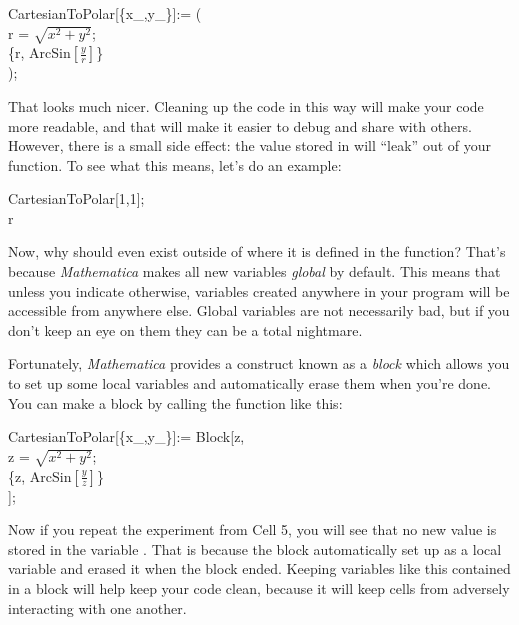 \begin{code}
	   CartesianToPolar[\{x\_,y\_\}]:= (\\
	   	r = $\sqrt{x^2 + y^2}$;\\
	   	\{r, ArcSin$\left[\frac{y}{r}\right]$\}\\
	   );\\
\end{code}

That looks much nicer. Cleaning up the code in this way will make your code more readable, and that will make it easier to debug and share with others. However, there is a small side effect: the value stored in  will ``leak'' out of your function. To see what this means, let's do an example:

\begin{code}
	   CartesianToPolar[{1,1}];\\
	   r\\
\end{code}

Now, why should  even exist outside of where it is defined in the  function? That's because \emph{Mathematica} makes all new variables \emph{global} by default. This means that unless you indicate otherwise, variables created anywhere in your program will be accessible from anywhere else. Global variables are not necessarily bad, but if you don't keep an eye on them they can be a total nightmare.

Fortunately, \emph{Mathematica} provides a construct known as a \emph{block} which allows you to set up some local variables and automatically erase them when you're done. You can make a block by calling the  function like this:

\begin{code}
	   CartesianToPolar[\{x\_,y\_\}]:= Block[{z},\\
			 z = $\sqrt{x^2 + y^2}$;\\
			 \{z, ArcSin$\left[\frac{y}{z}\right]$\}\\
	   ];\\
\end{code}

Now if you repeat the experiment from Cell 5, you will see that no new value is stored in the variable . That is because the block automatically set  up as a local variable and erased it when the block ended. Keeping variables like this contained in a block will help keep your code clean, because it will keep cells from adversely interacting with one another. 

